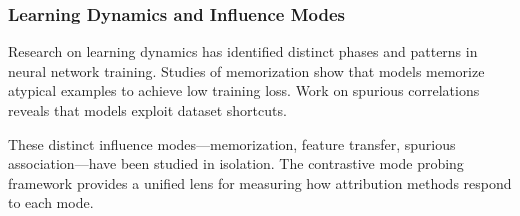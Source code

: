 \subsubsection{Learning Dynamics and Influence Modes}

Research on learning dynamics has identified distinct phases and patterns in neural network training. Studies of memorization \citep{feldman2020memorization} show that models memorize atypical examples to achieve low training loss. Work on spurious correlations \citep{sagawa2020spurious} reveals that models exploit dataset shortcuts.

These distinct influence modes---memorization, feature transfer, spurious association---have been studied in isolation. The contrastive mode probing framework provides a unified lens for measuring how attribution methods respond to each mode.
